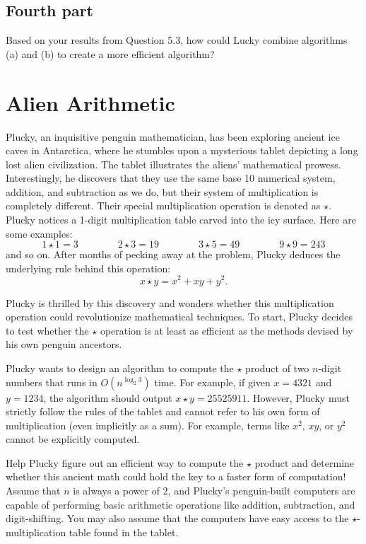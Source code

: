 \documentclass [12pt]{article}
\begin{document}
 

\subsection {Fourth part } Based on your results from Question 5.3, how could Lucky combine algorithms (a) and (b) to create a more efficient algorithm? 


\newpage

\section {Alien Arithmetic } Plucky, an inquisitive penguin mathematician, has been exploring ancient ice caves in Antarctica, where he stumbles upon a mysterious tablet depicting a long lost alien civilization. The tablet illustrates the aliens' mathematical prowess. Interestingly, he discovers that they use the same base 10 numerical system, addition, and subtraction as we do, but their system of multiplication is completely different. Their special multiplication operation is denoted as $\star $. Plucky notices a 1-digit multiplication table carved into the icy surface. Here are some examples: $$1 \star 1 = 3 \qquad \qquad 2 \star 3 = 19 \qquad \qquad 3 \star 5 = 49 \qquad \qquad 9 \star 9 = 243$$ and so on. After months of pecking away at the problem, Plucky deduces the underlying rule behind this operation: $$x \star y = x^2 + xy + y^2.$$ 

Plucky is thrilled by this discovery and wonders whether this multiplication operation could revolutionize mathematical techniques. To start, Plucky decides to test whether the $\star $ operation is at least as efficient as the methods devised by his own penguin ancestors. 

Plucky wants to design an algorithm to compute the $\star $ product of two $n$-digit numbers that runs in $O(n^{\log _2 3})$ time. For example, if given $x = 4321$ and $y = 1234$, the algorithm should output $x \star y = 25525911$. However, Plucky must strictly follow the rules of the tablet and cannot refer to his own form of multiplication (even implicitly as a sum). For example, terms like $x^2$, $xy$, or $y^2$ cannot be explicitly computed. 

Help Plucky figure out an efficient way to compute the $\star $ product and determine whether this ancient math could hold the key to a faster form of computation! Assume that $n$ is always a power of $2$, and Plucky’s penguin-built computers are capable of performing basic arithmetic operations like addition, subtraction, and digit-shifting. You may also assume that the computers have easy access to the $\star $-multiplication table found in the tablet. 
\end{document}
